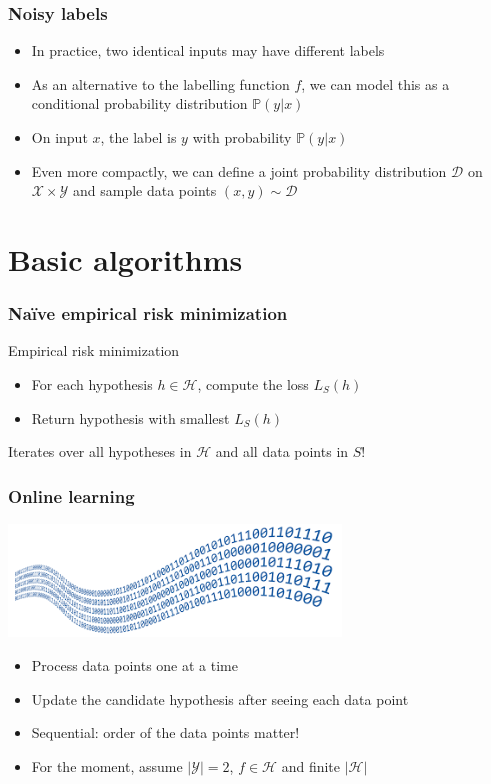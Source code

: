\documentclass[10pt]{beamer}
\begin{document}
\begin{frame}
  \frametitle{Noisy labels}
  \begin{itemize}
	\item In practice, two identical inputs may have different labels
	\item As an alternative to the labelling function $f$, we can model this as a {\color{red} conditional probability distribution $\mathbb{P}(y|x)$}
	\item On input $x$, the label is $y$ with probability $\mathbb{P}(y|x)$
	\item Even more compactly, we can define a {\color{blue} joint probability distribution $\mathcal{D}$} on $\mathcal{X}\times\mathcal{Y}$ and sample data points $(x,y)\sim\mathcal{D}$
  \end{itemize}
\end{frame}

\section{Basic algorithms}

\begin{frame}
  \frametitle{Na\"ive empirical risk minimization}
  \begin{block}{Empirical risk minimization}
	\begin{itemize}
	\item For each hypothesis $h\in\mathcal{H}$, compute the loss $L_S(h)$
	\item Return hypothesis with smallest $L_S(h)$
	\end{itemize}
  \end{block}
  Iterates over {\color{red} all hypotheses} in $\mathcal{H}$ and {\color{red} all data points} in $S$!
\end{frame}

\begin{frame}
  \frametitle{Online learning}
  \begin{center}
	\includegraphics[height=3cm]{images/stream.png}
  \end{center}
  \begin{itemize}
	\item Process data points one at a time
	\item Update the candidate hypothesis after seeing each data point
	\item {\color{blue} Sequential}: order of the data points matter!
	\item For the moment, {\color{green} assume $|\mathcal{Y}|=2$, $f\in\mathcal{H}$ and finite $|\mathcal{H}|$}
  \end{itemize}
\end{frame}
\end{document}
